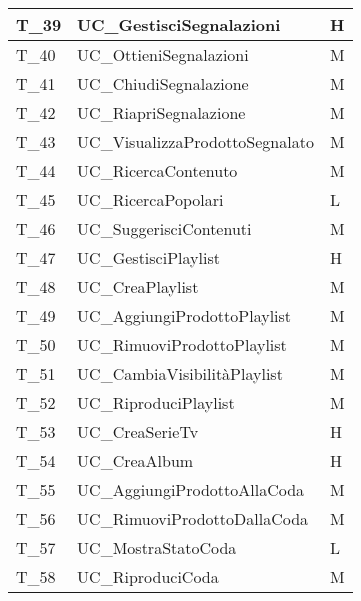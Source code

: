 \begin{longtable}{| p{} | p{} | p{} |}
    T\_39            & UC\_GestisciSegnalazioni              & H                 \\\hline
    T\_40            & UC\_OttieniSegnalazioni               & M                 \\\hline
    T\_41            & UC\_ChiudiSegnalazione                & M                 \\\hline
    T\_42            & UC\_RiapriSegnalazione                & M                 \\\hline
    T\_43            & UC\_VisualizzaProdottoSegnalato       & M                 \\\hline
    T\_44            & UC\_RicercaContenuto                  & M                 \\\hline
    T\_45            & UC\_RicercaPopolari                   & L                 \\\hline
    T\_46            & UC\_SuggerisciContenuti               & M                 \\\hline
    T\_47            & UC\_GestisciPlaylist                  & H                 \\\hline
    T\_48            & UC\_CreaPlaylist                      & M                 \\\hline
    T\_49            & UC\_AggiungiProdottoPlaylist          & M                 \\\hline
    T\_50            & UC\_RimuoviProdottoPlaylist           & M                 \\\hline
    T\_51            & UC\_CambiaVisibilitàPlaylist          & M                 \\\hline
    T\_52            & UC\_RiproduciPlaylist                 & M                 \\\hline
    T\_53            & UC\_CreaSerieTv                       & H                 \\\hline
    T\_54            & UC\_CreaAlbum                         & H                 \\\hline
    T\_55            & UC\_AggiungiProdottoAllaCoda          & M                 \\\hline
    T\_56            & UC\_RimuoviProdottoDallaCoda          & M                 \\\hline
    T\_57            & UC\_MostraStatoCoda                   & L                 \\\hline
    T\_58            & UC\_RiproduciCoda                     & M                 \\\hline

\end{longtable}
